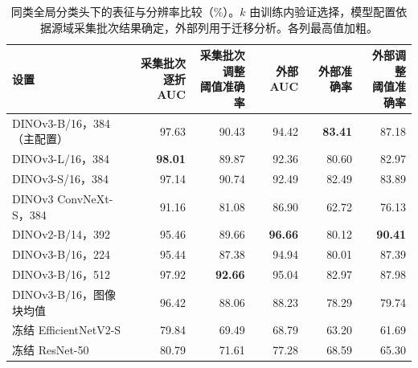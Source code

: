 \begin{table}[htbp]
\centering\small
\caption{同类全局分类头下的表征与分辨率比较（\%）。$k$ 由训练内验证选择，模型配置依据源域采集批次结果确定，外部列用于迁移分析。各列最高值加粗。}
\label{tab:backbone}
\begin{adjustbox}{max width=\linewidth}
\begin{tabular}{lrrrrr}
\toprule
设置 & \makecell{采集批次逐折\\AUC} & \makecell{采集批次调整\\阈值准确率} & 外部 AUC & 外部准确率 & \makecell{外部调整\\阈值准确率}\\
\midrule
DINOv3-B/16，384（主配置）\cite{simeoni2026} & 97.63 & 90.43 & 94.42 & \textbf{83.41} & 87.18\\
DINOv3-L/16，384 & \textbf{98.01} & 89.87 & 92.36 & 80.60 & 82.97\\
DINOv3-S/16，384 & 97.14 & 90.74 & 92.49 & 82.49 & 83.89\\
DINOv3 ConvNeXt-S，384 & 91.16 & 81.08 & 86.90 & 62.72 & 76.13\\
DINOv2-B/14，392\cite{oquab2024} & 95.46 & 89.66 & \textbf{96.66} & 80.12 & \textbf{90.41}\\
DINOv3-B/16，224 & 95.44 & 87.38 & 94.94 & 80.01 & 87.39\\
DINOv3-B/16，512 & 97.92 & \textbf{92.66} & 95.04 & 82.97 & 87.98\\
DINOv3-B/16，图像块均值 & 96.42 & 88.06 & 88.23 & 78.29 & 79.74\\
冻结 EfficientNetV2-S\cite{tan2021} & 79.84 & 69.49 & 68.79 & 63.20 & 61.69\\
冻结 ResNet-50\cite{he2016} & 80.79 & 71.61 & 77.28 & 68.59 & 65.30\\
\bottomrule
\end{tabular}
\end{adjustbox}
\end{table}
